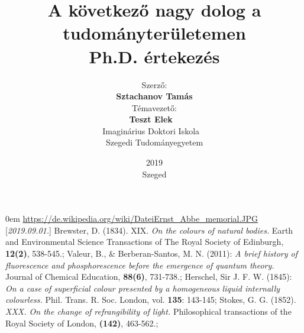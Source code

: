 \documentclass[12pt,a4paper,titlepage,twoside]{article}
\title
{
	\textbf{A következő nagy dolog a tudományterületemen} \\
	\vspace{0.5cm}
	Ph.D. értekezés
}
\author
{
	Szerző:
	\\\textbf{Sztachanov Tamás}	
	\\[2cm]Témavezető:
	\\\textbf{Teszt Elek}
	~\\[4cm]Imaginárius Doktori Iskola
	~\\Szegedi Tudományegyetem
}
\date
{
	2019\\ Szeged
}
\numberwithin{equation}{section}
\numberwithin{figure}{section}
\begin{document}
\makeatother

\maketitle

\tableofcontents

\begin{spacing}{1.5}
\newpage
%
%
%
%
%
%
%
%
%

\end{spacing}
\begin{spacing}{1}
%
\begin{thebibliography}{999}
\itemsep0em
\href{https://de.wikipedia.org/wiki/Datei:Ernst_Abbe_memorial.JPG}{https://de.wikipedia.org/wiki/Datei\:Ernst\_Abbe\_memorial.JPG}
\mbox{[\textit{2019.09.01.}]}
Brewster, D. (1834). XIX. \textit{On the colours of natural bodies.} Earth and Environmental Science Transactions of The Royal Society of Edinburgh, \textbf{12(2)}, 538-545.;
\mbox{}
Valeur, B., \& Berberan-Santos, M. N. (2011): \textit{A brief history of fluorescence and phosphorescence before the emergence of quantum theory.} Journal of Chemical Education, \textbf{88(6)}, 731-738.;
\mbox{}
Herschel, Sir J. F. W. (1845): \textit{On a case of superficial colour presented by a homogeneous liquid internally colourless.}  Phil. Trans. R. Soc. London, vol. \textbf{135}: 143-145;
\mbox{}
Stokes, G. G. (1852). \textit{XXX. On the change of refrangibility of light.} Philosophical transactions of the Royal Society of London, \textbf{(142)}, 463-562.;
\end{thebibliography}
\end{spacing}
\end{document}
